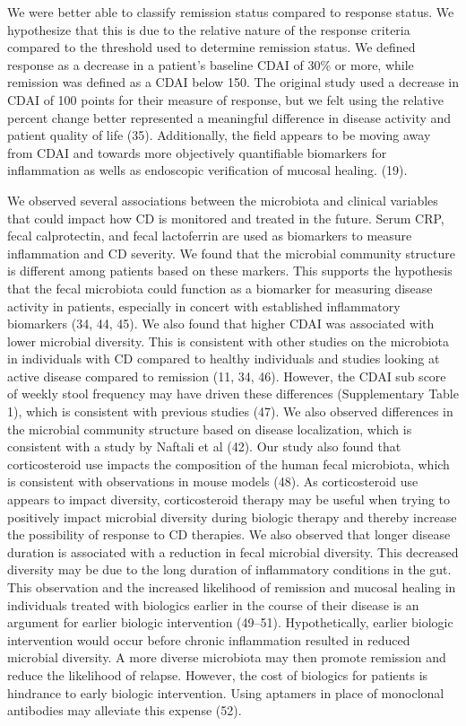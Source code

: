 \documentclass[12pt,]{article}
\begin{document}
We were better able to classify remission status compared to response
status. We hypothesize that this is due to the relative nature of the
response criteria compared to the threshold used to determine remission
status. We defined response as a decrease in a patient's baseline CDAI
of 30\% or more, while remission was defined as a CDAI below 150. The
original study used a decrease in CDAI of 100 points for their measure
of response, but we felt using the relative percent change better
represented a meaningful difference in disease activity and patient
quality of life (35). Additionally, the field appears to be moving away
from CDAI and towards more objectively quantifiable biomarkers for
inflammation as wells as endoscopic verification of mucosal healing.
(19).

We observed several associations between the microbiota and clinical
variables that could impact how CD is monitored and treated in the
future. Serum CRP, fecal calprotectin, and fecal lactoferrin are used as
biomarkers to measure inflammation and CD severity. We found that the
microbial community structure is different among patients based on these
markers. This supports the hypothesis that the fecal microbiota could
function as a biomarker for measuring disease activity in patients,
especially in concert with established inflammatory biomarkers (34, 44,
45). We also found that higher CDAI was associated with lower microbial
diversity. This is consistent with other studies on the microbiota in
individuals with CD compared to healthy individuals and studies looking
at active disease compared to remission (11, 34, 46). However, the CDAI
sub score of weekly stool frequency may have driven these differences
(Supplementary Table 1), which is consistent with previous studies (47).
We also observed differences in the microbial community structure based
on disease localization, which is consistent with a study by Naftali et
al (42). Our study also found that corticosteroid use impacts the
composition of the human fecal microbiota, which is consistent with
observations in mouse models (48). As corticosteroid use appears to
impact diversity, corticosteroid therapy may be useful when trying to
positively impact microbial diversity during biologic therapy and
thereby increase the possibility of response to CD therapies. We also
observed that longer disease duration is associated with a reduction in
fecal microbial diversity. This decreased diversity may be due to the
long duration of inflammatory conditions in the gut. This observation
and the increased likelihood of remission and mucosal healing in
individuals treated with biologics earlier in the course of their
disease is an argument for earlier biologic intervention (49--51).
Hypothetically, earlier biologic intervention would occur before chronic
inflammation resulted in reduced microbial diversity. A more diverse
microbiota may then promote remission and reduce the likelihood of
relapse. However, the cost of biologics for patients is hindrance to
early biologic intervention. Using aptamers in place of monoclonal
antibodies may alleviate this expense (52).
\end{document}
